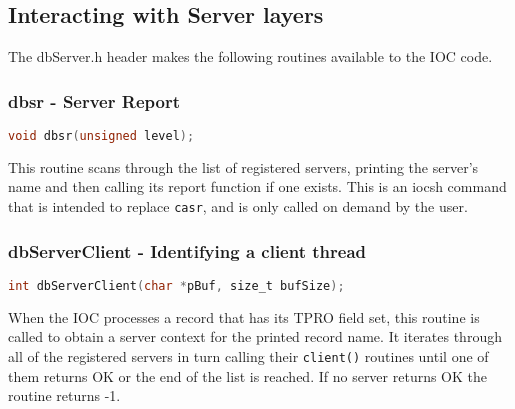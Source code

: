 \subsection{Interacting with Server layers}

The dbServer.h header makes the following routines available to the IOC code.

\subsubsection{dbsr - Server Report}

\begin{lstlisting}[language=C]
void dbsr(unsigned level);
\end{lstlisting}

This routine scans through the list of registered servers, printing the server's name and then calling its report function if one exists.
This is an iocsh command that is intended to replace \verb|casr|, and is only called on demand by the user.

\subsubsection{dbServerClient - Identifying a client thread}

\begin{lstlisting}[language=C]
int dbServerClient(char *pBuf, size_t bufSize);
\end{lstlisting}

When the IOC processes a record that has its TPRO field set, this routine is called to obtain a server context for the printed record name.
It iterates through all of the registered servers in turn calling their \verb|client()| routines until one of them returns OK or the end of the list is reached.
If no server returns OK the routine returns -1.


